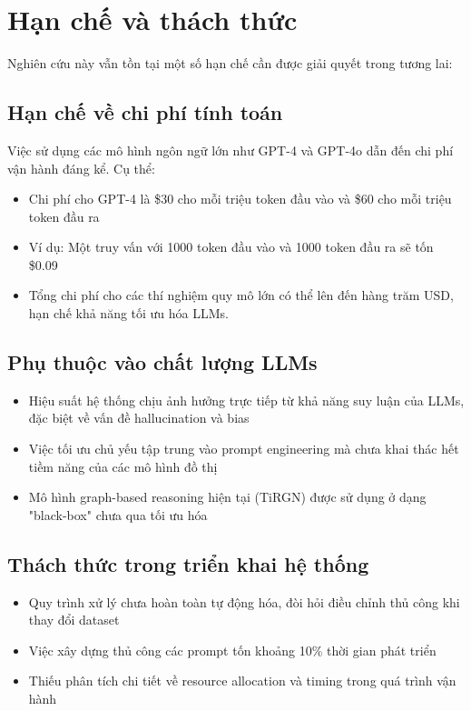 \section{Hạn chế và thách thức}
Nghiên cứu này vẫn tồn tại một số hạn chế cần được giải quyết trong tương lai:

\subsection{Hạn chế về chi phí tính toán}
Việc sử dụng các mô hình ngôn ngữ lớn như GPT-4 và GPT-4o dẫn đến chi phí vận hành đáng kể. Cụ thể:
\begin{itemize}
\item Chi phí cho GPT-4 là \$30 cho mỗi triệu token đầu vào và \$60 cho mỗi triệu token đầu ra
\item Ví dụ: Một truy vấn với 1000 token đầu vào và 1000 token đầu ra sẽ tốn \$0.09
\item Tổng chi phí cho các thí nghiệm quy mô lớn có thể lên đến hàng trăm USD, hạn chế khả năng tối ưu hóa LLMs.
\end{itemize}

\subsection{Phụ thuộc vào chất lượng LLMs}
\begin{itemize}
\item Hiệu suất hệ thống chịu ảnh hưởng trực tiếp từ khả năng suy luận của LLMs, đặc biệt về vấn đề hallucination và bias
\item Việc tối ưu chủ yếu tập trung vào prompt engineering mà chưa khai thác hết tiềm năng của các mô hình đồ thị
\item Mô hình graph-based reasoning hiện tại (TiRGN) được sử dụng ở dạng "black-box" chưa qua tối ưu hóa
\end{itemize}

\subsection{Thách thức trong triển khai hệ thống}
\begin{itemize}
\item Quy trình xử lý chưa hoàn toàn tự động hóa, đòi hỏi điều chỉnh thủ công khi thay đổi dataset
\item Việc xây dựng thủ công các prompt tốn khoảng 10\% thời gian phát triển
\item Thiếu phân tích chi tiết về resource allocation và timing trong quá trình vận hành
\end{itemize}

